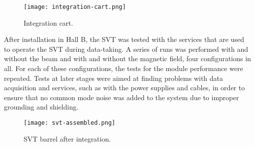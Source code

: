 \begin{figure}[hbt] 
\centering 
\texttt{[image: integration-cart.png]}
\caption{Integration cart.}
\label{fig:integration-cart}
\end{figure}

After installation in Hall B, the SVT was tested with the services that are used to operate the SVT during data-taking. A series of runs was performed with and without the beam and with and without the magnetic field, four configurations in all. For each of these configurations, the tests for the module performance were repeated. Tests at later stages were aimed at finding problems with data acquisition and services, such as with the power supplies and cables, in order to ensure that no common mode noise was added to the system due to improper grounding and shielding. 

\begin{figure}[hbt] 
\centering 
\texttt{[image: svt-assembled.png]}
\caption{SVT barrel after integration.}
\label{fig:svt-assembled}
\end{figure}
